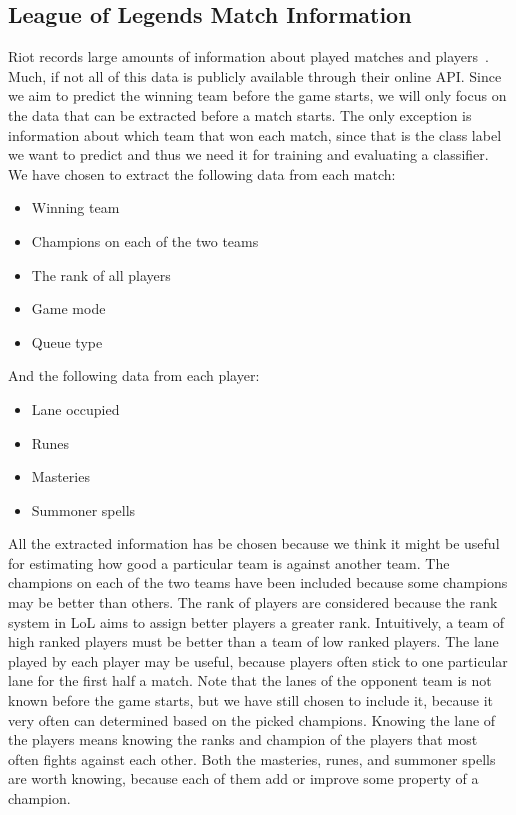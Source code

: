 \subsection{League of Legends Match Information}\label{sec:matchdata}
Riot records large amounts of information about played matches and players~\cite{matchinfo}. Much, if not all of this data is publicly available through their online API. Since we aim to predict the winning team before the game starts, we will only focus on the data that can be extracted before a match starts. The only exception is information about which team that won each match, since that is the class label we want to predict and thus we need it for training and evaluating a classifier.
We have chosen to extract the following data from each match:
\begin{itemize}
\item Winning team
\item Champions on each of the two teams
\item The rank of all players
\item Game mode
\item Queue type
\end{itemize}
And the following data from each player:
\begin{itemize}
\item Lane occupied 
\item Runes 
\item Masteries 
\item Summoner spells 
\end{itemize}
All the extracted information has be chosen because we think it might be useful for estimating how good a particular team is against another team. 
The champions on each of the two teams have been included because some champions may be better than others.
The rank of players are considered because the rank system in LoL aims to assign better players a greater rank. Intuitively, a team of high ranked players must be better than a team of low ranked players.
The lane played by each player may be useful, because players often stick to one particular lane for the first half a match.
Note that the lanes of the opponent team is not known before the game starts, but we have still chosen to include it, because it very often can determined based on the picked champions. Knowing the lane of the players means knowing the ranks and champion of the players that most often fights against each other.
Both the masteries, runes, and summoner spells are worth knowing, because each of them add or improve some property of a champion. 
